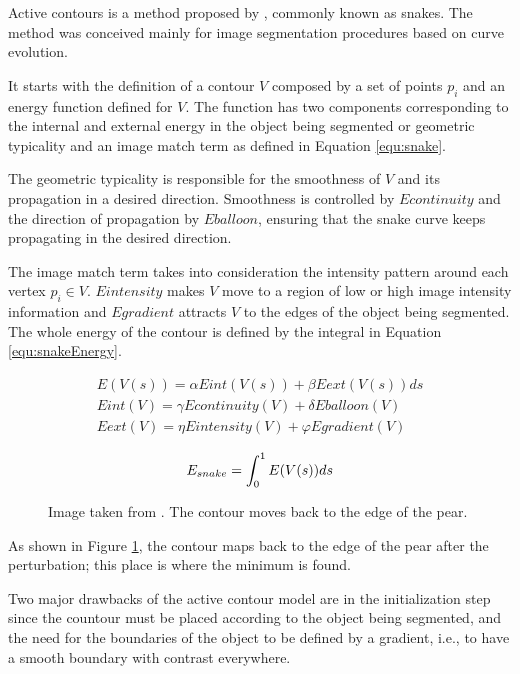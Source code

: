 Active contours is a method proposed by \cite{kass1988snakes}, commonly known as snakes.
The method was conceived mainly for image segmentation procedures based on curve evolution.

It starts with the definition of a contour $V$ composed by a set of points $p_i$ and an energy function defined for $V$. 
The function has two components corresponding to the internal and external energy in the object being segmented or geometric typicality and
an image match term as defined in Equation \ref{equ:snake}. 

The geometric typicality is responsible for the smoothness of $V$ and its propagation in a desired direction.
Smoothness is controlled by $Econtinuity$ and the direction of propagation by $Eballoon$, ensuring that
the snake curve keeps propagating in the desired direction. 

The image match term takes into consideration the intensity pattern around each vertex $p_i \in V$.
$Eintensity$ makes $V$ move to a region of low or high image intensity information and 
$Egradient$ attracts $V$ to the edges of the object being segmented. 
The whole energy of the contour is defined by the integral in Equation \ref{equ:snakeEnergy}.

\begin{eqnarray} 
 E(V(s)) = \alpha Eint(V(s)) + \beta Eext (V(s)) ds\\
 Eint (V) = \gamma Econtinuity (V) + \delta Eballoon (V)\\
 Eext (V) = \eta Eintensity (V) + \varphi Egradient (V)
 \label{equ:snake}
\end{eqnarray}

\begin{equation}
 E_{snake} = \int_0^1 E(V(s)) ds\\
 \label{equ:snakeEnergy}
\end{equation}

\begin{figure} 
 \centering 
 \caption[Snake's energy.]{Image taken from \cite{kass1988snakes}. The contour moves back to the edge of the pear.}
 \label{fig:snakes}  
\end{figure}

As shown in Figure \ref{fig:snakes}, the contour maps back to the edge of the pear after the perturbation; 
this place is where the minimum is found.

Two major drawbacks of the active contour model are in the initialization step 
since the countour must be placed according to the object being segmented, 
and the need for the boundaries of the object to be defined by a gradient, i.e., to have a smooth boundary with contrast everywhere. 

